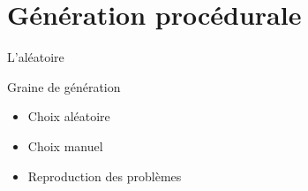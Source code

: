 \documentclass{beamer}
\begin{document}
{\section{Génération procédurale}
\begin{frame}{L'al\'eatoire}
    \begin{block}{Graine de génération}
        \begin{itemize}
            \item[\bullet] Choix aléatoire
            \item[\bullet] Choix manuel
            \item[\bullet] Reproduction des problèmes
        \end{itemize}
    \end{block}
\end{frame}

}
\end{document}
